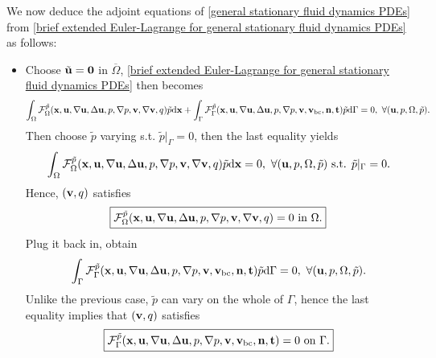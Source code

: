 \documentclass[oneside]{book}
\numberwithin{equation}{section}
\begin{document}
\begin{itemize}[leftmargin=0in]
    We now deduce the adjoint equations of \eqref{general stationary fluid dynamics PDEs} from \eqref{brief extended Euler-Lagrange for general stationary fluid dynamics PDEs} as follows:
    \begin{itemize}
        \item Choose $\tilde{\bf u} = {\bf 0}$ in $\overline{\Omega}$, \eqref{brief extended Euler-Lagrange for general stationary fluid dynamics PDEs} then becomes
        \begin{align*}
            \int_\Omega \mathcal{F}_\Omega^{\tilde{p}}({\bf x},{\bf u},\nabla{\bf u},\Delta{\bf u},p,\nabla p,{\bf v},\nabla{\bf v},q)\tilde{p}{\rm d}{\bf x} + \int_\Gamma \mathcal{F}_\Gamma^{\tilde{p}}({\bf x},{\bf u},\nabla{\bf u},\Delta{\bf u},p,\nabla p,{\bf v},{\bf v}_{\rm bc},{\bf n},{\bf t})\tilde{p}{\rm d}\Gamma = 0,\ \forall({\bf u},p,\Omega,\tilde{p}).
        \end{align*}
        Then choose $\tilde{p}$ varying s.t. $\tilde{p}|_\Gamma = 0$, then the last equality yields
        \begin{align*}
            \int_\Omega \mathcal{F}_\Omega^{\tilde{p}}({\bf x},{\bf u},\nabla{\bf u},\Delta{\bf u},p,\nabla p,{\bf v},\nabla{\bf v},q)\tilde{p}{\rm d}{\bf x} = 0,\ \forall({\bf u},p,\Omega,\tilde{p}) \mbox{ s.t. } \tilde{p}|_\Gamma = 0.
        \end{align*}
        Hence, $({\bf v},q)$ satisfies
        \begin{align}
            \label{extended domain integrand variation p}
            \boxed{\mathcal{F}_\Omega^{\tilde{p}}({\bf x},{\bf u},\nabla{\bf u},\Delta{\bf u},p,\nabla p,{\bf v},\nabla{\bf v},q) = 0 \mbox{ in } \Omega.}
        \end{align}
        Plug it back in, obtain
        \begin{align*}
            \int_\Gamma \mathcal{F}_\Gamma^{\tilde{p}}({\bf x},{\bf u},\nabla{\bf u},\Delta{\bf u},p,\nabla p,{\bf v},{\bf v}_{\rm bc},{\bf n},{\bf t})\tilde{p}{\rm d}\Gamma = 0,\ \forall({\bf u},p,\Omega,\tilde{p}).
        \end{align*}
        Unlike the previous case, $\tilde{p}$ can vary on the whole of $\Gamma$, hence the last equality implies that $({\bf v},q)$ satisfies
        \begin{align}
            \label{extended boundary integrand variation p}
            \boxed{\mathcal{F}_\Gamma^{\tilde{p}}({\bf x},{\bf u},\nabla{\bf u},\Delta{\bf u},p,\nabla p,{\bf v},{\bf v}_{\rm bc},{\bf n},{\bf t}) = 0 \mbox{ on } \Gamma.}
        \end{align}

\end{itemize}
\end{itemize}
\end{document}
